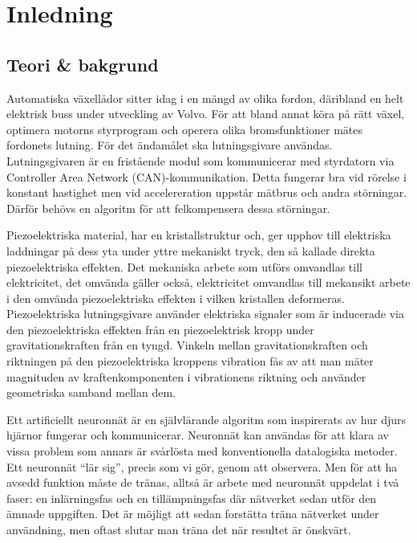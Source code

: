 \section{Inledning}
\subsection{Teori \& bakgrund}

Automatiska växellådor sitter idag i en mängd av olika fordon,
däribland en helt elektrisk buss under utveckling av Volvo.
För att bland annat köra på rätt växel, optimera motorns styrprogram
och operera olika bromsfunktioner %
mätes fordonets lutning.
För det ändamålet ska lutningsgivare användas.
Lutningsgivaren är en fristående modul som kommunicerar med styrdatorn via
Controller Area Network (CAN)-kommunikation.
Detta fungerar bra vid rörelse i konstant hastighet
men vid accelereration uppstår mätbrus och andra störningar.
Därför behövs en algoritm för att felkompensera dessa störningar.


Piezoelektriska material, har en kristallstruktur och, ger upphov till
elektriska laddningar på dess yta under yttre mekaniskt tryck, den så kallade
direkta piezoelektriska effekten.
Det mekaniska arbete som utförs omvandlas till elektricitet, det omvända gäller
också, elektricitet omvandlas till mekansikt arbete i den omvända
piezoelektriska effekten i vilken kristallen deformeras.
\autocite{electronicdesign2016}
Piezoelektriska lutningsgivare använder elektriska signaler som är
inducerade via den piezoelektriska effekten från en piezoelektrisk kropp
under gravitationskraften från en tyngd.
Vinkeln mellan gravitationskraften och
riktningen på den piezoelektriska kroppens vibration
fås av att man mäter magnituden av kraftenkomponenten i vibrationens riktning
och använder geometriska samband mellan dem.
\autocite{chiang00}

Ett artificiellt neuronnät är en självlärande algoritm som inspirerats av
hur djurs hjärnor fungerar och kommunicerar.
Neuronnät kan användas för att klara av vissa problem som annars är svårlösta
med konventionella datalogiska metoder.
Ett neuronnät ``lär sig'', precis som vi gör, genom att observera.
Men för att ha avsedd funktion måste de tränas, alltså är arbete med neuronnät
uppdelat i två faser: en inlärningsfas och en tillämpningsfas där nätverket sedan
utför den ämnade uppgiften.
\autocite{copeland16}
Det är möjligt att sedan forstätta träna nätverket
under användning, men oftast slutar man träna det när resultet är önskvärt.
\autocite{wiki-neuronnat}


